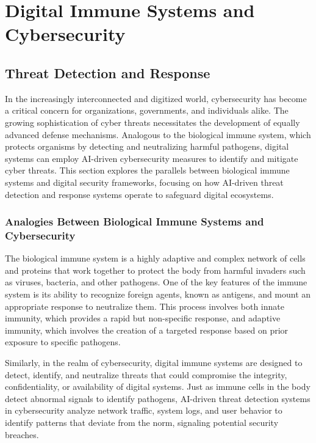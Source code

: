 \documentclass[12pt,twoside]{article}
\begin{document}
\section{Digital Immune Systems and Cybersecurity}

\subsection{Threat Detection and Response}

In the increasingly interconnected and digitized world, cybersecurity has become a critical concern for organizations, governments, and individuals alike. The growing sophistication of cyber threats necessitates the development of equally advanced defense mechanisms. Analogous to the biological immune system, which protects organisms by detecting and neutralizing harmful pathogens, digital systems can employ AI-driven cybersecurity measures to identify and mitigate cyber threats. This section explores the parallels between biological immune systems and digital security frameworks, focusing on how AI-driven threat detection and response systems operate to safeguard digital ecosystems.

\subsubsection{Analogies Between Biological Immune Systems and Cybersecurity}

The biological immune system is a highly adaptive and complex network of cells and proteins that work together to protect the body from harmful invaders such as viruses, bacteria, and other pathogens. One of the key features of the immune system is its ability to recognize foreign agents, known as antigens, and mount an appropriate response to neutralize them. This process involves both innate immunity, which provides a rapid but non-specific response, and adaptive immunity, which involves the creation of a targeted response based on prior exposure to specific pathogens.

Similarly, in the realm of cybersecurity, digital immune systems are designed to detect, identify, and neutralize threats that could compromise the integrity, confidentiality, or availability of digital systems. Just as immune cells in the body detect abnormal signals to identify pathogens, AI-driven threat detection systems in cybersecurity analyze network traffic, system logs, and user behavior to identify patterns that deviate from the norm, signaling potential security breaches.
\end{document}
